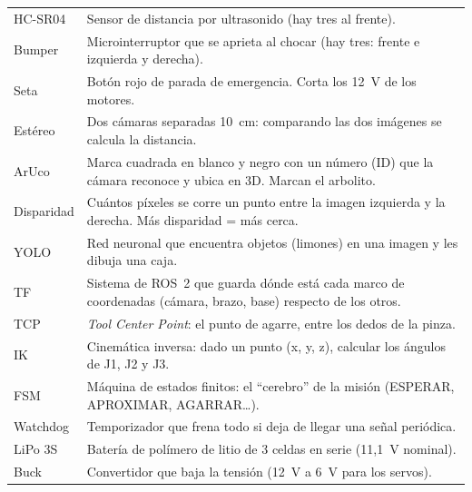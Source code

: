 \begin{longtable}{@{}p{3.2cm} p{12.3cm}@{}}
HC-SR04 & Sensor de distancia por ultrasonido (hay tres al frente). \\
Bumper & Microinterruptor que se aprieta al chocar (hay tres: frente e izquierda y derecha). \\
Seta & Botón rojo de parada de emergencia. Corta los 12~V de los motores. \\
Estéreo & Dos cámaras separadas 10~cm: comparando las dos imágenes se calcula la distancia. \\
ArUco & Marca cuadrada en blanco y negro con un número (ID) que la cámara reconoce y ubica en 3D. Marcan el arbolito. \\
Disparidad & Cuántos píxeles se corre un punto entre la imagen izquierda y la derecha. Más disparidad = más cerca. \\
YOLO & Red neuronal que encuentra objetos (limones) en una imagen y les dibuja una caja. \\
TF & Sistema de ROS~2 que guarda dónde está cada marco de coordenadas (cámara, brazo, base) respecto de los otros. \\
TCP & \textit{Tool Center Point}: el punto de agarre, entre los dedos de la pinza. \\
IK & Cinemática inversa: dado un punto (x, y, z), calcular los ángulos de J1, J2 y J3. \\
FSM & Máquina de estados finitos: el ``cerebro'' de la misión (ESPERAR, APROXIMAR, AGARRAR\ldots). \\
Watchdog & Temporizador que frena todo si deja de llegar una señal periódica. \\
LiPo 3S & Batería de polímero de litio de 3 celdas en serie (11,1~V nominal). \\
Buck & Convertidor que baja la tensión (12~V a 6~V para los servos). \\
\bottomrule
\end{longtable}
